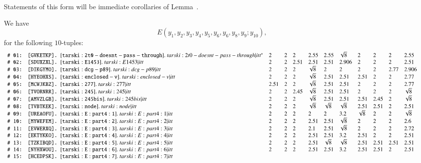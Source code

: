 Statements of this form will be immediate corollaries of Lemma~.

\newpage
\begin{lemma}
We have 
   $$
   E(y_1,y_2,y_3,y_4,y_5,y_6,y_6,y_8,y_9;y_{10}),
   $$
for the following $10$-tuples:
$$
\def\tuid#1{\text{\guid{#1}}}
\def\rr#1{\text{\tt \# #1:}}
\begin{array}{llllllllllll}
%
 \rr{01}&\tuid{GVKETKP} \tlabel{tarski:2t0-doesnt-pass-through}\usage{DCG-[4.19]{ lemma:2t0-doesnt-pass-through}}
   &2 &2 &2 & 2.55&  2.55 & \sqrt{8}&  2 & 2 & 2 & 2.55\\
%
 \rr{02}&\tuid{SDUXZXL}\tlabel{tarski:E1453}
   &2 &2 &2.51 &2.51& 2.51 &2.906& 2 & 2 &2 & 2.51\\ 
%
 \rr{03}&\tuid{DIKGYMO}\tlabel{tarski:dcg-p89}
   &2 &2 &2 &\sqrt8& 2 &2& 2 & 2 & 2.77 &2.906\\
%
 \rr{04}&\tuid{HYEOHXS}\tlabel{tarski:enclosed-v}
   &2 &2 &2 &\sqrt{8}& 2.51 &2.51& 2.51 & 2 & 2 &  2.77\\
%
 \rr{05}&\tuid{MCWJKBZ}\tlabel{tarski:277}
   &2.51 &2 &2 &\sqrt{8}& 2.51 &2.51& 2 & 2 & 2 & 2.77\\
%
 \rr{06}&\tuid{TVORNRR}\tlabel{tarski:245}
   &2 &2 &2.45 &\sqrt{8}& 2.51 &2.51& 2 & 2 & 2 & \sqrt{8}\\
%
 \rr{07}&\tuid{AMVZLGB}\tlabel{tarski:245bis}
   &2 &2 &2 &\sqrt{8}& 2.51 &2.51& 2.51 & 2.45 & 2 & \sqrt{8}\\
%
 \rr{08}&\tuid{TVBTKEK}\tlabel{tarski:node}
   &2 &2 &2 &\sqrt8& \sqrt8 &\sqrt8& 2.51 & 2.51 & 2 & 2.51\\
%
 \rr{09}&\tuid{UREAOFU}\tlabel{tarski:E:part4:1}
   &2 &2 &2 &  2& 2 &3.2&   \sqrt{8} & 2 & 2 &  \sqrt{8}\\
%
 \rr{10}&\tuid{MYWEFEM}\tlabel{tarski:E:part4:2}
   &2 &2 &2 &2.51 & 2.51  &\sqrt{8}&   2 & 2 & 2 &  2.6\\
%
 \rr{11}&\tuid{EVWERXQ}\tlabel{tarski:E:part4:3}
   &2 &2 &2 &2.1& 2.51  &\sqrt{8}&   2 & 2 & 2 &  2.72\\
%
 \rr{12}&\tuid{EKTYKKO}\tlabel{tarski:E:part4:4}
   &    2 &2 &2 &  2.51& 2.51 &3.2&   2.51 & 2 & 2 & 2.51\\
%
 \rr{13}&\tuid{TZKIBQD}\tlabel{tarski:E:part4:5}
   &2 &2 &2 &2.51& \sqrt{8} &\sqrt{8}& 2.51 & 2.51 & 2.51 & 2.51\\
%
 \rr{14}&\tuid{NYHXWOU}\tlabel{tarski:E:part4:6}
   &2 &2 &2 &2.51& 2.51 &3.2& 2.51 & 2.51 & 2 & 2.51\\
%
 \rr{15}&\tuid{HCEDPSK}\tlabel{tarski:E:part4:7}

\end{array}$$
\end{lemma}
